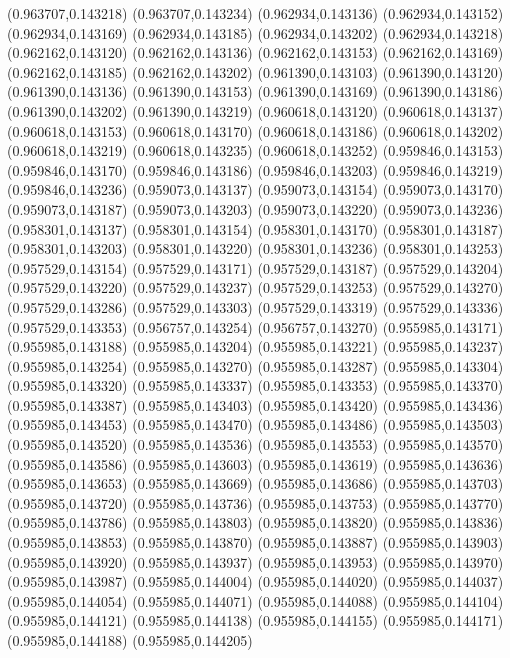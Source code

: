 (0.963707,0.143218)
(0.963707,0.143234)
(0.962934,0.143136)
(0.962934,0.143152)
(0.962934,0.143169)
(0.962934,0.143185)
(0.962934,0.143202)
(0.962934,0.143218)
(0.962162,0.143120)
(0.962162,0.143136)
(0.962162,0.143153)
(0.962162,0.143169)
(0.962162,0.143185)
(0.962162,0.143202)
(0.961390,0.143103)
(0.961390,0.143120)
(0.961390,0.143136)
(0.961390,0.143153)
(0.961390,0.143169)
(0.961390,0.143186)
(0.961390,0.143202)
(0.961390,0.143219)
(0.960618,0.143120)
(0.960618,0.143137)
(0.960618,0.143153)
(0.960618,0.143170)
(0.960618,0.143186)
(0.960618,0.143202)
(0.960618,0.143219)
(0.960618,0.143235)
(0.960618,0.143252)
(0.959846,0.143153)
(0.959846,0.143170)
(0.959846,0.143186)
(0.959846,0.143203)
(0.959846,0.143219)
(0.959846,0.143236)
(0.959073,0.143137)
(0.959073,0.143154)
(0.959073,0.143170)
(0.959073,0.143187)
(0.959073,0.143203)
(0.959073,0.143220)
(0.959073,0.143236)
(0.958301,0.143137)
(0.958301,0.143154)
(0.958301,0.143170)
(0.958301,0.143187)
(0.958301,0.143203)
(0.958301,0.143220)
(0.958301,0.143236)
(0.958301,0.143253)
(0.957529,0.143154)
(0.957529,0.143171)
(0.957529,0.143187)
(0.957529,0.143204)
(0.957529,0.143220)
(0.957529,0.143237)
(0.957529,0.143253)
(0.957529,0.143270)
(0.957529,0.143286)
(0.957529,0.143303)
(0.957529,0.143319)
(0.957529,0.143336)
(0.957529,0.143353)
(0.956757,0.143254)
(0.956757,0.143270)
(0.955985,0.143171)
(0.955985,0.143188)
(0.955985,0.143204)
(0.955985,0.143221)
(0.955985,0.143237)
(0.955985,0.143254)
(0.955985,0.143270)
(0.955985,0.143287)
(0.955985,0.143304)
(0.955985,0.143320)
(0.955985,0.143337)
(0.955985,0.143353)
(0.955985,0.143370)
(0.955985,0.143387)
(0.955985,0.143403)
(0.955985,0.143420)
(0.955985,0.143436)
(0.955985,0.143453)
(0.955985,0.143470)
(0.955985,0.143486)
(0.955985,0.143503)
(0.955985,0.143520)
(0.955985,0.143536)
(0.955985,0.143553)
(0.955985,0.143570)
(0.955985,0.143586)
(0.955985,0.143603)
(0.955985,0.143619)
(0.955985,0.143636)
(0.955985,0.143653)
(0.955985,0.143669)
(0.955985,0.143686)
(0.955985,0.143703)
(0.955985,0.143720)
(0.955985,0.143736)
(0.955985,0.143753)
(0.955985,0.143770)
(0.955985,0.143786)
(0.955985,0.143803)
(0.955985,0.143820)
(0.955985,0.143836)
(0.955985,0.143853)
(0.955985,0.143870)
(0.955985,0.143887)
(0.955985,0.143903)
(0.955985,0.143920)
(0.955985,0.143937)
(0.955985,0.143953)
(0.955985,0.143970)
(0.955985,0.143987)
(0.955985,0.144004)
(0.955985,0.144020)
(0.955985,0.144037)
(0.955985,0.144054)
(0.955985,0.144071)
(0.955985,0.144088)
(0.955985,0.144104)
(0.955985,0.144121)
(0.955985,0.144138)
(0.955985,0.144155)
(0.955985,0.144171)
(0.955985,0.144188)
(0.955985,0.144205)
